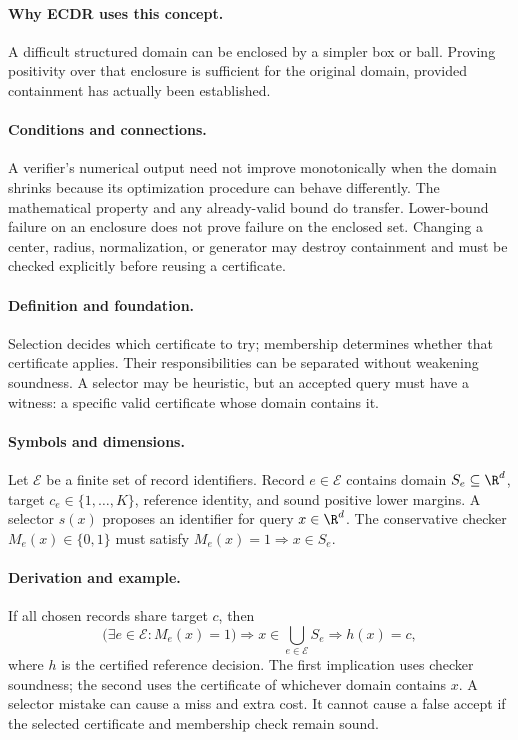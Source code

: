 \paragraph{Why ECDR uses this concept.}
A difficult structured domain can be enclosed by a simpler box or ball. Proving positivity over that enclosure is sufficient for the original domain, provided containment has actually been established.
\paragraph{Conditions and connections.}
A verifier's numerical output need not improve monotonically when the domain shrinks because its optimization procedure can behave differently. The mathematical property and any already-valid bound do transfer. Lower-bound failure on an enclosure does not prove failure on the enclosed set. Changing a center, radius, normalization, or generator may destroy containment and must be checked explicitly before reusing a certificate.

\paragraph{Definition and foundation.}
Selection decides which certificate to try; membership determines whether that certificate applies. Their responsibilities can be separated without weakening soundness. A selector may be heuristic, but an accepted query must have a witness: a specific valid certificate whose domain contains it.
\paragraph{Symbols and dimensions.}
Let $\mathcal E$ be a finite set of record identifiers. Record $e\in\mathcal E$ contains domain $S_e\subseteq\R^d$, target $c_e\in\{1,\ldots,K\}$, reference identity, and sound positive lower margins. A selector $s(x)$ proposes an identifier for query $x\in\R^d$. The conservative checker $M_e(x)\in\{0,1\}$ must satisfy $M_e(x)=1\Rightarrow x\in S_e$.
\paragraph{Derivation and example.}
If all chosen records share target $c$, then
\[
 \bigl(\exists e\in\mathcal E:M_e(x)=1\bigr)
 \Longrightarrow x\in\bigcup_{e\in\mathcal E}S_e
 \Longrightarrow h(x)=c,
\]
where $h$ is the certified reference decision. The first implication uses checker soundness; the second uses the certificate of whichever domain contains $x$. A selector mistake can cause a miss and extra cost. It cannot cause a false accept if the selected certificate and membership check remain sound.
